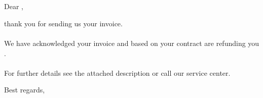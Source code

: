 \documentclass[parskip=half,
fontsize=11pt,
fromemail=true
]{scrlttr2}
\begin{document}
\begin{letter}{\sffamily\large{\receivername \\ \receiverstreet \\ \receivercity }}

\opening{Dear \salutation \lastname,}
thank you for sending us your invoice.
\\\\
We have acknowledged your invoice and based on your contract are refunding you  . 
\\\\
For further details see the attached description or call our service center.

\closing{Best regards,}


\end{letter}
\end{document}
